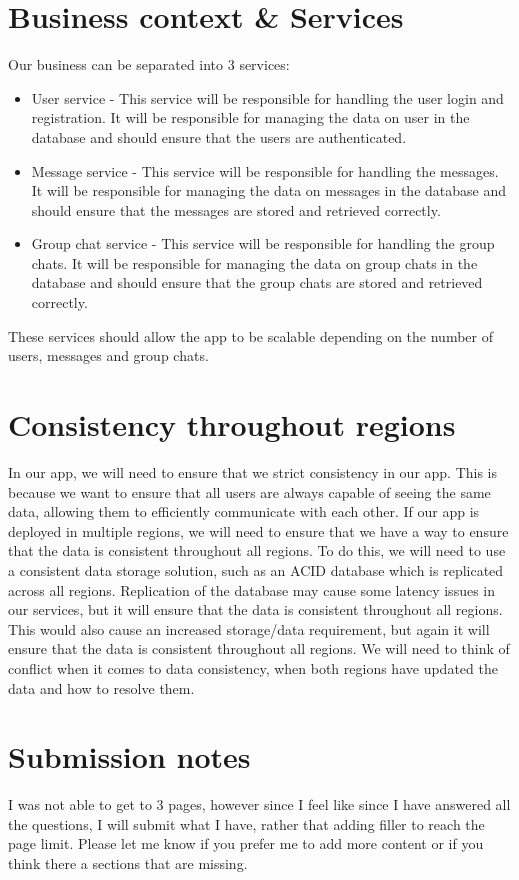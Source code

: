 \documentclass[12pt]{Article}
\begin{document}
\section{Business context \& Services}
Our business can be separated into 3 services:

\begin{itemize}
    \item User service - This service will be responsible for handling the user login and registration. It will be responsible for managing the data on user in the database and should ensure that the users are authenticated.
    \item Message service - This service will be responsible for handling the messages. It will be responsible for managing the data on messages in the database and should ensure that the messages are stored and retrieved correctly.
    \item Group chat service - This service will be responsible for handling the group chats. It will be responsible for managing the data on group chats in the database and should ensure that the group chats are stored and retrieved correctly.
\end{itemize}

These services should allow the app to be scalable depending on the number of users, messages and group chats.

\section{Consistency throughout regions}
In our app, we will need to ensure that we strict consistency in our app.
This is because we want to ensure that all users are always capable of seeing the same data, allowing them to efficiently communicate with each other.
If our app is deployed in multiple regions, we will need to ensure that we have a way to ensure that the data is consistent throughout all regions.
To do this, we will need to use a consistent data storage solution, such as an ACID database which is replicated across all regions.
Replication of the database may cause some latency issues in our services, but it will ensure that the data is consistent throughout all regions.
This would also cause an increased storage/data requirement, but again it will ensure that the data is consistent throughout all regions.
We will need to think of conflict when it comes to data consistency, when both regions have updated the data and how to resolve them.

\section{Submission notes}
I was not able to get to 3 pages, however since I feel like since I have answered all the questions, I will submit what I have, rather that adding filler to reach the page limit.
Please let me know if you prefer me to add more content or if you think there a sections that are missing.
\end{document}
